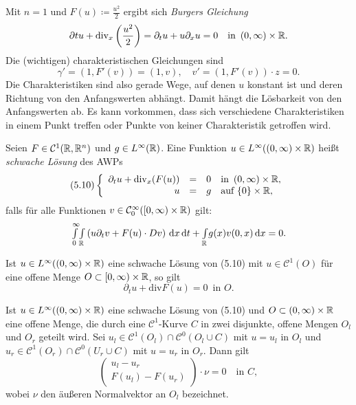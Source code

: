 \documentclass{cheat-sheet}
\newcommand{\dive}{\mathrm{div}} %
\begin{document}
\begin{bsp}
  Mit $n=1$ und $F(u) \coloneqq \tfrac{u^2}{2}$ ergibt sich \emph{Burgers Gleichung}
  \[
    \partial t u + \dive_x \left( \frac{u^2}{2} \right) = \partial_t u + u \partial_x u = 0
    \quad \text{in } \ointerval{0}{\infty} \times \R.
  \]
  Die (wichtigen) charakteristischen Gleichungen sind
  \[
    \gamma' = (1, F'(v)) = (1, v), \quad
    v' = (1, F'(v)) \cdot z = 0.
  \]
  Die Charakteristiken sind also gerade Wege, auf denen $u$ konstant ist und deren Richtung von den Anfangswerten abhängt. Damit hängt die Lösbarkeit von den Anfangswerten ab. Es kann vorkommen, dass sich verschiedene Charakteristiken in einem Punkt treffen oder Punkte von keiner Charakteristik getroffen wird.
\end{bsp}

\begin{defn}
  Seien $F \in \mathcal{C}^1(\mathbb{R}, \mathbb{R}^n)$ und $g \in L^\infty(\mathbb{R})$. Eine Funktion $u \in L^\infty(\left( 0, \infty \right) \times \mathbb{R})$ heißt \emph{schwache Lösung} des AWPs
  \[
    (5.10) \left\{ \begin{array}{rlll}
      \partial_t u + \dive_x(F(u)) & = & 0 & \text{in } \ointerval{0}{\infty} \times \R, \\
      u & = & g & \text{auf } \{ 0 \} \times \R,
    \end{array} \right.
  \]
  falls für alle Funktionen $v \in \mathcal{C}_0^\infty(\left[ 0, \infty \right) \times \mathbb{R})$ gilt:
  \[
    {\textstyle \int\limits_{0}^{\infty}} {\textstyle \int\limits_{\mathbb{R}}^{}} \left( u \partial_t v + F(u) \cdot D v \right) \,\mathrm{d} x \,\mathrm{d} t + {\textstyle \int\limits_{\mathbb{R}}^{}} g(x) v(0, x) \,\mathrm{d} x = 0.
  \]
\end{defn}

\begin{lem}
  Ist $u \in L^\infty(\left( 0, \infty \right) \times \mathbb{R})$ eine schwache Lösung von (5.10) mit $u \in \mathcal{C}^1(O)$ für eine offene Menge $O \subset \left[ 0, \infty \right) \times \mathbb{R}$, so gilt
  \[ \partial_t u + \dive F(u) = 0 \enspace \text{in } O. \]
\end{lem}

\begin{lem}
  Ist $u \in L^\infty(\left( 0, \infty \right) \times \mathbb{R})$ eine schwache Lösung von (5.10) und $O \subset \left( 0, \infty \right) \times \mathbb{R}$ eine offene Menge, die durch eine $\mathcal{C}^1$-Kurve $C$ in zwei disjunkte, offene Mengen $O_l$ und $O_r$ geteilt wird. Sei $u_l \in \mathcal{C}^1(O_l) \cap \mathcal{C}^0(O_l \cup C)$ mit $u = u_l$ in $O_l$ und $u_r \in \mathcal{C}^1(O_r) \cap \mathcal{C}^0(U_r \cup C)$ mit $u = u_r$ in $O_r$. Dann gilt
  \[
    \begin{pmatrix}
      u_l - u_r \\
      F(u_l) - F(u_r)
    \end{pmatrix} \cdot \nu = 0
    \quad \text{in } C,
  \]
  wobei $\nu$ den äußeren Normalvektor an $O_l$ bezeichnet.
\end{lem}
\end{document}
